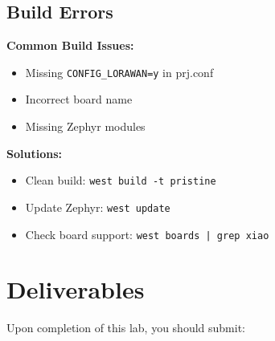 \documentclass[11pt,a4paper]{article}
\begin{document}
\subsection{Build Errors}

\begin{warningbox}
\textbf{Common Build Issues:}
\begin{itemize}
    \item Missing \texttt{CONFIG\_LORAWAN=y} in prj.conf
    \item Incorrect board name
    \item Missing Zephyr modules
\end{itemize}

\textbf{Solutions:}
\begin{itemize}
    \item Clean build: \texttt{west build -t pristine}
    \item Update Zephyr: \texttt{west update}
    \item Check board support: \texttt{west boards | grep xiao}
\end{itemize}
\end{warningbox}

\section{Deliverables}

Upon completion of this lab, you should submit:
\end{document}
